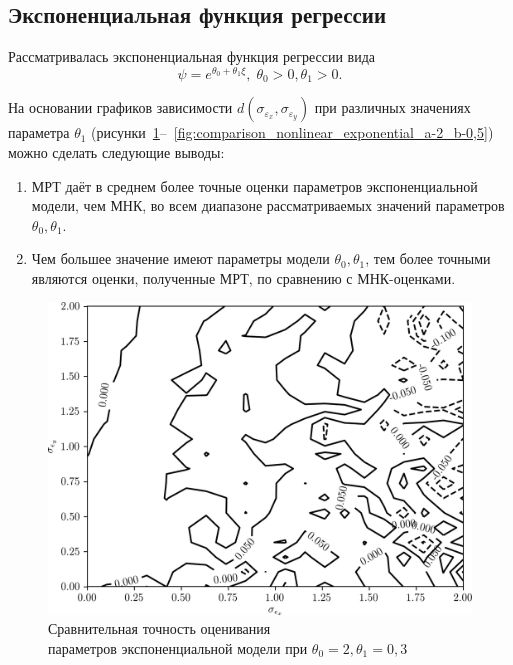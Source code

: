 \vspace{2\baselineskip}
\subsection{Экспоненциальная функция регрессии}

Рассматривалась экспоненциальная функция регрессии вида
\[ \psi = e^{\theta_0 + \theta_1 \xi}, \; \theta_0 > 0, \theta_1 > 0. \]

На основании графиков зависимости \( d(\sigma_{\varepsilon_x}, \sigma_{\varepsilon_y}) \)
при различных значениях параметра \( \theta_1 \)
(рисунки~\ref{fig:comparison_nonlinear_exponential_a-2_b-0,3}--~\ref{fig:comparison_nonlinear_exponential_a-2_b-0,5}) можно сделать следующие выводы:
\begin{enumerate}
\item МРТ даёт в среднем более точные оценки параметров экспоненциальной модели, чем МНК,
  во всем диапазоне рассматриваемых значений параметров \( \theta_0, \theta_1 \).
\item Чем большее значение имеют параметры модели \( \theta_0, \theta_1 \),
  тем более точными являются оценки, полученные МРТ, по сравнению с МНК-оценками.
\end{enumerate}

\vspace{2\baselineskip}
\begin{figure}[h]
  \centering
  \includegraphics[width=135mm]{fig/nonlinear/exponential/a-2_b-0,3.png}
  \caption{
    Сравнительная точность оценивания \\
    параметров экспоненциальной модели при \( \theta_0 = 2, \theta_1 = 0{,}3 \)
  }\label{fig:comparison_nonlinear_exponential_a-2_b-0,3}
\end{figure}

